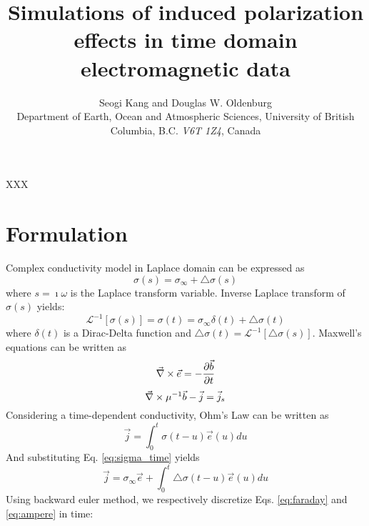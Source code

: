 \documentclass[extra,mreferee]{gji}
\author[Seogi Kang and Douglas W. Oldenburg]
   {Seogi Kang and Douglas W. Oldenburg \\
    Department of Earth, Ocean and Atmospheric Sciences,
    University of British Columbia,
    B.C. \emph{V6T 1Z4}, Canada
  }
\title{Simulations of induced polarization effects in time domain electromagnetic data}
\newcommand{\curl}{{\vec \nabla}\times}
\newcommand{\siginf}{\sigma_\infty}
\newcommand{\dsig}{\triangle\sigma}
\renewcommand {\j}  { {\vec j} }
\renewcommand {\b}  { {\vec b} }
\newcommand {\e}  { {\vec e} }
\begin{document}
\label{firstpage}

\maketitle


\begin{summary}
XXX
\end{summary}


\section{Formulation}
Complex conductivity model in Laplace domain can be expressed as
\begin{equation}
  \sigma (s) = \siginf + \dsig (s)
\end{equation}
where $s=\imath \omega$ is the Laplace transform variable. Inverse Laplace transform of $\sigma(s)$ yields:
\begin{equation}
  \mathcal{L}^{-1}[\sigma(s)] = \sigma(t) = \siginf \delta (t) + \dsig (t)
  \label{eq:sigma_time}
\end{equation}
where  $\delta(t)$ is a Dirac-Delta function and $\dsig(t) = \mathcal{L}^{-1}[\dsig(s)]$.
Maxwell's equations can be written as
\begin{equation}
  \curl \e = -\frac{\partial \b}{\partial t} \\
  \label{eq:faraday}
\end{equation}
\begin{equation}
  \curl \mu^{-1} \b - \j = \j_s \\
  \label{eq:ampere}
\end{equation}
Considering a time-dependent conductivity, Ohm's Law can be written as
\begin{equation}
  \j = \int_0^t \sigma(t-u) \e (u) du
  \label{eq:ohmslaw}
\end{equation}
And substituting Eq. \ref{eq:sigma_time} yields
\begin{equation}
  \j = \siginf \e + \int_0^t \dsig(t-u) \e (u) du
  \label{eq:ohmslaw_two}
\end{equation}
Using backward euler method, we respectively discretize Eqs. \ref{eq:faraday} and \ref{eq:ampere} in time:
\end{document}
